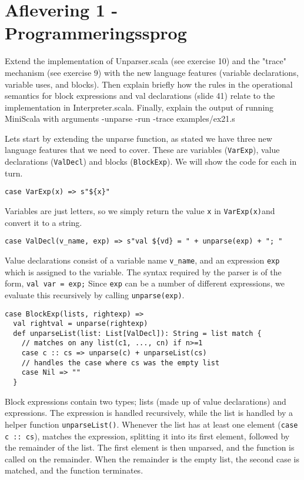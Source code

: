 \documentclass[working, oneside]{../../../../Preambles/tuftebook}
\begin{document}
\let\cleardoublepage\clearpage
\thispagestyle{fancy}
\chapter{Aflevering 1 - Programmeringssprog}

\begin{exercise}[1]
Extend the implementation of Unparser.scala (see exercise 10) and the "trace" mechanism (see exercise 9) with the new language features (variable declarations, variable uses, and blocks). Then explain briefly how the rules in the operational semantics for block expressions and val declarations (slide 41) relate to the implementation in Interpreter.scala. Finally, explain the output of running MiniScala with arguments -unparse -run -trace examples/ex21.s
\end{exercise}
\begin{solution}
Lets start by extending the unparse function, as stated we have three new language features that we need to cover. These are variables (\texttt{VarExp}), value declarations (\texttt{ValDecl}) and blocks (\texttt{BlockExp}). We will show the code for each in turn.
\begin{lstlisting}
case VarExp(x) => s"${x}"
\end{lstlisting}
Variables are just letters, so we simply return the value \texttt{x} in \texttt{VarExp(x)}and convert it to a string.
\begin{lstlisting}
case ValDecl(v_name, exp) => s"val ${vd} = " + unparse(exp) + "; "
\end{lstlisting}
Value declarations consist of a variable name \texttt{v\_name}, and an expression \texttt{exp} which is assigned to the variable. The syntax required by the parser is of the form, \texttt{val var = exp;} Since \texttt{exp} can be a number of different expressions, we evaluate this recursively by calling \texttt{unparse(exp)}. 
\begin{lstlisting}
case BlockExp(lists, rightexp) =>
  val rightval = unparse(rightexp)
  def unparseList(list: List[ValDecl]): String = list match {
    // matches on any list(c1, ..., cn) if n>=1
    case c :: cs => unparse(c) + unparseList(cs)
    // handles the case where cs was the empty list
    case Nil => ""
  }
\end{lstlisting}
Block expressions contain two types; lists (made up of value declarations) and expressions. The expression is handled recursively, while the list is handled by a helper function \texttt{unparseList()}. Whenever the list has at least one element (\texttt{case c :: cs}), matches the expression, splitting it into its first element, followed by the remainder of the list. The first element is then unparsed, and the function is called on the remainder. When the remainder is the empty list, the second case is matched, and the function terminates.
\end{solution}
\end{document}
